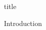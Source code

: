 \documentclass{article}
\begin{document}
{title}

\tableofcontents

\listoffigures
\listoftables

{Introduction}

\newpage

\end{document}
